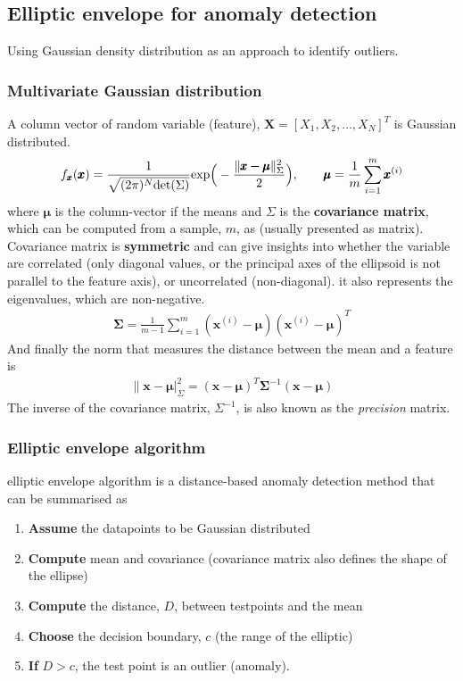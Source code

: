 \documentclass[a4paper,10pt]{article}
\begin{document}
\subsection{Elliptic envelope for anomaly detection}
Using Gaussian density distribution as an approach to identify outliers. 
\subsubsection{Multivariate Gaussian distribution}
A column vector of random variable (feature), $\pmb{X} = [X_1, X_2, \dots, X_N]^T$ is Gaussian distributed. 
\begin{gather*}
    f_{\pmb{x}}(\pmb{x}) = \frac{1}{\sqrt{(2\pi)^N\text{det}(\Sigma)}}\text{exp}\Big(-\frac{\lVert\pmb{x-\mu}\rVert^2_\Sigma}{2}\Big),
    \hspace*{0.7cm}
    \pmb{\mu}=\frac{1}{m}\sum_{i=1}^{m}\pmb{x}^{(i)}
\end{gather*}
where $\pmb{\mu}$ is the column-vector if the means and $\Sigma$ is the \textbf{covariance matrix}, which can be computed from a sample, $m$, as (usually presented as matrix). Covariance matrix is \textbf{symmetric} and can give insights into whether the variable are correlated (only diagonal values, or the principal axes of the ellipsoid is not parallel to the feature axis), or uncorrelated (non-diagonal). it also represents the eigenvalues, which are non-negative.
\begin{gather*}
    \pmb{\Sigma} = \frac{1}{m-1}\sum_{i=1}^{m}(\pmb{x}^{(i)}-\pmb{\mu})(\pmb{x}^{(i)}-\pmb{\mu})^T
\end{gather*}
And finally the norm that measures the distance between the mean and a feature is
\begin{gather*}
    \lVert\pmb{x}-\pmb{\mu}\rvert^2_\Sigma = (\pmb{x}-\pmb{\mu})^T\pmb{\Sigma}^{-1}(\pmb{x}-\pmb{\mu})
\end{gather*}
The inverse of the covariance matrix, $\Sigma^{-1}$, is also known as the \textit{precision} matrix. 
\subsubsection{Elliptic envelope algorithm}
elliptic envelope algorithm is a distance-based anomaly detection method that can be summarised as 
\begin{enumerate}
    \item \textbf{Assume} the datapoints to be Gaussian distributed
    \item \textbf{Compute} mean and covariance (covariance matrix also defines the shape of the ellipse)
    \item \textbf{Compute} the distance, $D$, between testpoints and the mean
    \item \textbf{Choose} the decision boundary, $c$ (the range of the elliptic)
    \item \textbf{If} $D>c$, the test point is an outlier (anomaly). 
\end{enumerate}
\end{document}
